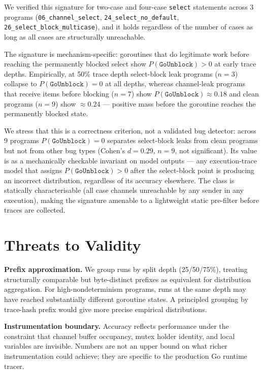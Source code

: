 \documentclass[10pt,conference]{IEEEtran}
\newcommand{\eunblock}{\texttt{GoUnblock}}
\begin{document}
We verified this signature for two-case and four-case \texttt{select}
statements across 3 programs (\texttt{06\_channel\_select},
\texttt{24\_select\_no\_default}, \texttt{26\_select\_block\_multicase}),
and it holds regardless of the number of cases as long as all cases
are structurally unreachable.

The signature is mechanism-specific: goroutines that do legitimate
work before reaching the permanently blocked select show
$P(\eunblock){>}0$ at early trace depths.
Empirically, at 50\% trace depth select-block leak programs ($n{=}3$)
collapse to $P(\eunblock){=}0$ at all depths, whereas channel-leak
programs that receive items before blocking ($n{=}7$) show
$P(\eunblock){\approx}0.18$ and clean programs ($n{=}9$) show
${\approx}0.24$ — positive mass before the goroutine reaches the
permanently blocked state.

We stress that this is a correctness criterion, not a validated bug
detector: across 9 programs $P(\eunblock){=}0$ separates select-block
leaks from clean programs but not from other bug types (Cohen's
$d{=}0.29$, $n{=}9$, not significant). Its value is as a mechanically
checkable invariant on model outputs — any execution-trace model that
assigns $P(\eunblock){>}0$ after the select-block point is producing an
incorrect distribution, regardless of its accuracy elsewhere. The class
is statically characterisable (all case channels unreachable by any
sender in any execution), making the signature amenable to a lightweight
static pre-filter before traces are collected.

\section{Threats to Validity}\label{sec:threats}

\textbf{Prefix approximation.}
We group runs by split depth (25/50/75\%), treating structurally
comparable but byte-distinct prefixes as equivalent for distribution
aggregation.
For high-nondeterminism programs, runs at the same depth may have
reached substantially different goroutine states.
A principled grouping by trace-hash prefix would give more precise
empirical distributions.

\textbf{Instrumentation boundary.}
Accuracy reflects performance under the constraint that channel buffer
occupancy, mutex holder identity, and local variables are invisible.
Numbers are not an upper bound on what richer instrumentation could
achieve; they are specific to the production Go runtime tracer.
\end{document}
